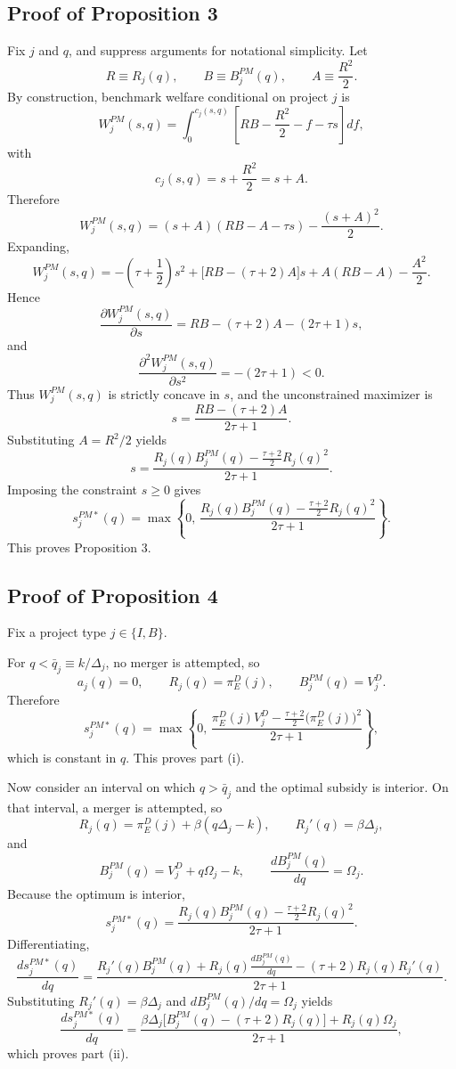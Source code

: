 \subsection{Proof of Proposition 3}

Fix \(j\) and \(q\), and suppress arguments for notational simplicity. Let
\[
R \equiv R_j(q), \qquad B \equiv B_j^{PM}(q), \qquad A \equiv \frac{R^2}{2}.
\]
By construction, benchmark welfare conditional on project \(j\) is
\[
W_j^{PM}(s,q)=\int_0^{c_j(s,q)}
\left[
RB-\frac{R^2}{2}-f-\tau s
\right]df,
\]
with
\[
c_j(s,q)=s+\frac{R^2}{2}=s+A.
\]
Therefore
\[
W_j^{PM}(s,q)
=
(s+A)(RB-A-\tau s)-\frac{(s+A)^2}{2}.
\]
Expanding,
\[
W_j^{PM}(s,q)
=
-\left(\tau+\frac12\right)s^2
+
\bigl[RB-(\tau+2)A\bigr]s
+
A(RB-A)-\frac{A^2}{2}.
\]
Hence
\[
\frac{\partial W_j^{PM}(s,q)}{\partial s}
=
RB-(\tau+2)A-(2\tau+1)s,
\]
and
\[
\frac{\partial^2 W_j^{PM}(s,q)}{\partial s^2}
=
-(2\tau+1)<0.
\]
Thus \(W_j^{PM}(s,q)\) is strictly concave in \(s\), and the unconstrained maximizer is
\[
s=\frac{RB-(\tau+2)A}{2\tau+1}.
\]
Substituting \(A=R^2/2\) yields
\[
s=\frac{R_j(q)B_j^{PM}(q)-\frac{\tau+2}{2}R_j(q)^2}{2\tau+1}.
\]
Imposing the constraint \(s\ge 0\) gives
\[
s_j^{PM*}(q)
=
\max\left\{
0,\,
\frac{R_j(q)B_j^{PM}(q)-\frac{\tau+2}{2}R_j(q)^2}{2\tau+1}
\right\}.
\]
This proves Proposition 3.

\subsection{Proof of Proposition 4}

Fix a project type \(j\in\{I,B\}\).

For \(q<\bar q_j\equiv k/\Delta_j\), no merger is attempted, so
\[
a_j(q)=0,
\qquad
R_j(q)=\pi_E^D(j),
\qquad
B_j^{PM}(q)=V_j^D.
\]
Therefore
\[
s_j^{PM*}(q)
=
\max\left\{
0,\,
\frac{\pi_E^D(j)V_j^D-\frac{\tau+2}{2}\bigl(\pi_E^D(j)\bigr)^2}{2\tau+1}
\right\},
\]
which is constant in \(q\). This proves part (i).

Now consider an interval on which \(q>\bar q_j\) and the optimal subsidy is interior. On that interval,
a merger is attempted, so
\[
R_j(q)=\pi_E^D(j)+\beta(q\Delta_j-k),
\qquad
R_j'(q)=\beta\Delta_j,
\]
and
\[
B_j^{PM}(q)=V_j^D+q\Omega_j-k,
\qquad
\frac{dB_j^{PM}(q)}{dq}=\Omega_j.
\]
Because the optimum is interior,
\[
s_j^{PM*}(q)
=
\frac{R_j(q)B_j^{PM}(q)-\frac{\tau+2}{2}R_j(q)^2}{2\tau+1}.
\]
Differentiating,
\[
\frac{ds_j^{PM*}(q)}{dq}
=
\frac{
R_j'(q)B_j^{PM}(q)
+
R_j(q)\frac{dB_j^{PM}(q)}{dq}
-
(\tau+2)R_j(q)R_j'(q)
}{2\tau+1}.
\]
Substituting \(R_j'(q)=\beta\Delta_j\) and \(dB_j^{PM}(q)/dq=\Omega_j\) yields
\[
\frac{ds_j^{PM*}(q)}{dq}
=
\frac{
\beta\Delta_j\bigl[B_j^{PM}(q)-(\tau+2)R_j(q)\bigr]
+
R_j(q)\Omega_j
}{2\tau+1},
\]
which proves part (ii).

